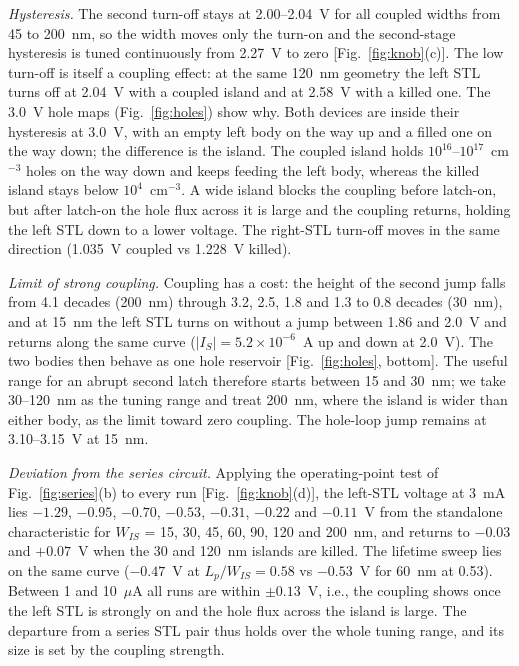 \documentclass[journal]{IEEEtran}
\begin{document}
\textit{Hysteresis.} The second turn-off stays at 2.00--2.04~V for all coupled widths from 45 to 200~nm, so the width moves only the turn-on and the second-stage hysteresis is tuned continuously from 2.27~V to zero [Fig.~\ref{fig:knob}(c)]. The low turn-off is itself a coupling effect: at the same 120~nm geometry the left STL turns off at 2.04~V with a coupled island and at 2.58~V with a killed one. The 3.0~V hole maps (Fig.~\ref{fig:holes}) show why. Both devices are inside their hysteresis at 3.0~V, with an empty left body on the way up and a filled one on the way down; the difference is the island. The coupled island holds $10^{16}$--$10^{17}$~cm$^{-3}$ holes on the way down and keeps feeding the left body, whereas the killed island stays below $10^{4}$~cm$^{-3}$. A wide island blocks the coupling before latch-on, but after latch-on the hole flux across it is large and the coupling returns, holding the left STL down to a lower voltage. The right-STL turn-off moves in the same direction (1.035~V coupled vs 1.228~V killed).

\textit{Limit of strong coupling.} Coupling has a cost: the height of the second jump falls from 4.1 decades (200~nm) through 3.2, 2.5, 1.8 and 1.3 to 0.8 decades (30~nm), and at 15~nm the left STL turns on without a jump between 1.86 and 2.0~V and returns along the same curve ($|I_S|=5.2\times10^{-6}$~A up and down at 2.0~V). The two bodies then behave as one hole reservoir [Fig.~\ref{fig:holes}, bottom]. The useful range for an abrupt second latch therefore starts between 15 and 30~nm; we take 30--120~nm as the tuning range and treat 200~nm, where the island is wider than either body, as the limit toward zero coupling. The hole-loop jump remains at 3.10--3.15~V at 15~nm.

\textit{Deviation from the series circuit.} Applying the operating-point test of Fig.~\ref{fig:series}(b) to every run [Fig.~\ref{fig:knob}(d)], the left-STL voltage at 3~mA lies $-1.29$, $-0.95$, $-0.70$, $-0.53$, $-0.31$, $-0.22$ and $-0.11$~V from the standalone characteristic for $W_{IS}$ = 15, 30, 45, 60, 90, 120 and 200~nm, and returns to $-0.03$ and $+0.07$~V when the 30 and 120~nm islands are killed. The lifetime sweep lies on the same curve ($-0.47$~V at $L_p/W_{IS}=0.58$ vs $-0.53$~V for 60~nm at 0.53). Between 1 and 10~$\mu$A all runs are within $\pm0.13$~V, i.e., the coupling shows once the left STL is strongly on and the hole flux across the island is large. The departure from a series STL pair thus holds over the whole tuning range, and its size is set by the coupling strength.
\end{document}
